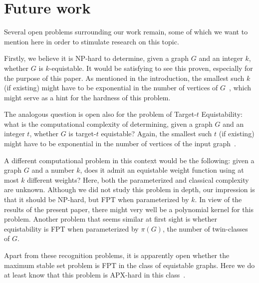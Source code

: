 \documentclass{llncs}
\begin{document}
\section{Future work}

Several open problems surrounding our work remain, some of which we want to mention here in order to stimulate
research on this topic.

Firstly, we believe it is NP-hard to determine, given a graph $G$ and an integer $k$, whether $G$ is $k$-equistable.
It would be satisfying to see this proven, especially for the purpose of this paper. As mentioned in the introduction, the smallest such $k$ (if existing) might have to be exponential in the number of vertices of $G$~\cite{MR2823204}, which might serve as a hint for the hardness of this problem.

The analogous question is open also for the problem of {\sc Target-$t$ Equistability}: what is the computational complexity of
determining, given a graph $G$ and an integer $t$, whether $G$ is target-$t$ equistable? Again, the smallest such $t$ (if existing) might have to be exponential in the number of vertices of the input graph~\cite{MR2823204}.

A different computational problem in this context would be the following: given a graph $G$ and a number $k$, does it admit an equistable weight function using at most $k$ different weights? Here, both the parameterized and classical complexity are unknown.
Although we did not study this problem in depth, our impression is that it should be NP-hard, but FPT when parameterized by $k$.
In view of the results of the present paper, there might very well be a polynomial kernel for this problem.
Another problem that seems similar at first sight is whether equistability is FPT when parameterized by $\pi(G)$, the number of twin-classes of $G$.

Apart from these recognition problems, it is apparently open whether the maximum stable set problem
is FPT in the class of equistable graphs. Here we do at least know that this problem is APX-hard in this class~\cite{MR2823204}.



\end{document}
